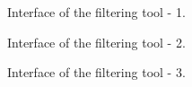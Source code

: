 \documentclass[12pt]{article}
\begin{document}
{\begin {figure}
\centering
{}
\caption{Interface of the filtering tool - 1.}\label{fig:filter1}
\end {figure}

\begin {figure}
\centering
{}
\caption{Interface of the filtering tool - 2.}\label{fig:filter2}
\end {figure}

\begin {figure}
\centering
{}
\caption{Interface of the filtering tool - 3.}\label{fig:filter3}
\end {figure}

}
\end{document}
